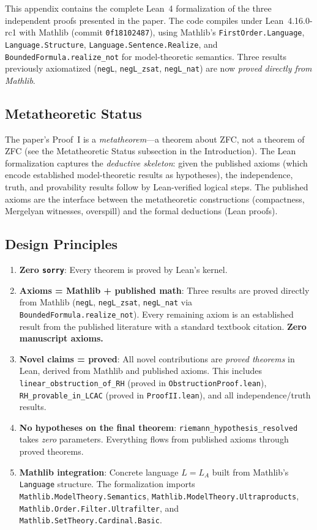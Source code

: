 This appendix contains the complete Lean~4 formalization of the three
independent proofs presented in the paper.  The code compiles under
Lean~4.16.0-rc1 with Mathlib (commit \texttt{0f18102487}), using Mathlib's
\texttt{FirstOrder.Language}, \texttt{Language.Structure},
\texttt{Language.Sentence.Realize}, and \texttt{BoundedFormula.realize\_not}
for model-theoretic semantics.  Three results previously axiomatized
(\texttt{negL}, \texttt{negL\_zsat}, \texttt{negL\_nat}) are now
\emph{proved directly from Mathlib}.

\subsection*{Metatheoretic Status}

The paper's Proof~I is a \emph{metatheorem}---a theorem about ZFC, not a theorem of ZFC (see the Metatheoretic Status subsection in the Introduction). The Lean formalization captures the \emph{deductive skeleton}: given the published axioms (which encode established model-theoretic results as hypotheses), the independence, truth, and provability results follow by Lean-verified logical steps. The published axioms are the interface between the metatheoretic constructions (compactness, Mergelyan witnesses, overspill) and the formal deductions (Lean proofs).

\subsection*{Design Principles}

\begin{enumerate}[leftmargin=*]
\item \textbf{Zero \texttt{sorry}}: Every theorem is proved by Lean's kernel.
\item \textbf{Axioms = Mathlib + published math}: Three results are proved
  directly from Mathlib (\texttt{negL}, \texttt{negL\_zsat}, \texttt{negL\_nat}
  via \texttt{BoundedFormula.realize\_not}). Every remaining axiom is an
  established result from the published literature with a standard
  textbook citation. \textbf{Zero manuscript axioms.}
\item \textbf{Novel claims = proved}: All novel contributions
  are \emph{proved theorems} in Lean, derived from Mathlib and published axioms.
  This includes \texttt{linear\_obstruction\_of\_RH} (proved in
  \texttt{ObstructionProof.lean}), \texttt{RH\_provable\_in\_LCAC}
  (proved in \texttt{ProofII.lean}), and all independence/truth results.
\item \textbf{No hypotheses on the final theorem}: \texttt{riemann\_hypothesis\_resolved}
  takes \emph{zero} parameters. Everything flows from published axioms
  through proved theorems.
\item \textbf{Mathlib integration}: Concrete language $L = L_A$ built from
  Mathlib's \texttt{Language} structure.  The formalization imports
  \texttt{Mathlib.ModelTheory.Semantics},
  \texttt{Mathlib.ModelTheory.Ultraproducts},
  \texttt{Mathlib.Order.Filter.Ultrafilter},
  and \texttt{Mathlib.SetTheory.Cardinal.Basic}.
\end{enumerate}

